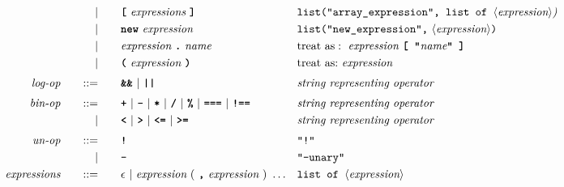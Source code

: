 \begin{alignat*}{9}
&&                       && |   &\quad &&   \textbf{\texttt{[}}\
                                            \textit{expressions}\
                                            \textbf{\texttt{]}}
                                                           && \texttt{list("array\_expression", list of  } \langle \textit{expression}\rangle \textit{)} \\
&&                       && |   &\quad &&  \textbf{\texttt{new}}\ \textit{expression}
                                                           && \texttt{list("new\_expression",}\ \langle  \textit{expression} \rangle \texttt{)} \\
&&                       && |   &\quad &&  \textit{expression}\ \textbf{\texttt{.}}\ \textit{name}
                                                           && \textrm{treat as}:\ \textit{expression}\ \textbf{\texttt{[ "}}\textit{name}\textbf{\texttt{" ]}}  \\
&&                       && |   &\quad &&  \textbf{\texttt{(}}\  \textit{expression} \
                                            \textbf{\texttt{)}} && \textrm{treat as:}\ \textit{expression} \\[1mm]
&& \textit{log-op}
                        &&\quad  ::= &\quad && \textbf{\texttt{\&\&}}\ |\ \texttt{\textbf{||}}
                                          && \textit{string representing operator} \\[1mm]
&& \textit{bin-op}
                        &&\quad  ::= &\quad && \textbf{\texttt{+}}\ |\ \textbf{\texttt{-}}\ |\ \textbf{\texttt{*}}\ |\ \textbf{\texttt{/}}\ |\ \textbf{\texttt{\%}}\ |\
                                   \textbf{\texttt{===}}\ |\ \textbf{\texttt{!==}}  && \textit{string representing operator} \\
&&                       && |  &\quad &&  \texttt{\textbf{<}}\ |\ \texttt{\textbf{>}}\ |\ \texttt{\textbf{<=}}\ |\ \texttt{\textbf{>=}}
                                          && \textit{string representing operator} \\[1mm]
&& \textit{un-op}
                        &&\quad  ::= &\quad && \textbf{\texttt{!}}
                        && \texttt{"!"} \\
&&
                        && | &\quad && \textbf{\texttt{-}}
                        && \texttt{"-unary"} \\
&& \textit{expressions}  &&\quad  ::= &\quad && \epsilon\ | \ \textit{expression}\ (
                                                               \ \textbf{\texttt{,}} \
                                                                 \textit{expression} \
                                                                      )\ \ldots
                                                            && \texttt{list of  } \langle \textit{expression}\rangle  \\
\end{alignat*}




